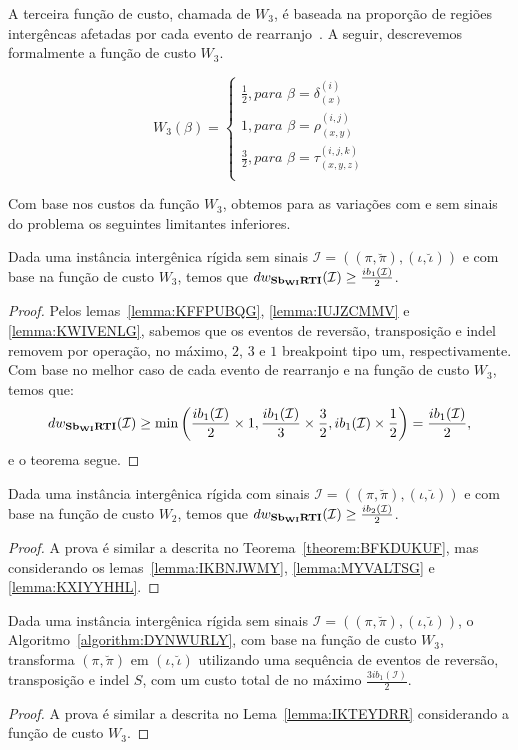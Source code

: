 A terceira função de custo, chamada de $W_3$, é baseada na proporção de regiões intergêncas afetadas por cada evento de rearranjo~\cite{2018-alexandrino-etal}. A seguir, descrevemos formalmente a função de custo $W_3$.

$$
  W_3(\beta) = \begin{cases}
      \frac{1}{2}, \textit{para } \beta = \delta_{(x)}^{(i)} \\
      1, \textit{para } \beta = \rho_{(x,y)}^{(i,j)} \\
      \frac{3}{2}, \textit{para } \beta = \tau_{(x,y,z)}^{(i,j,k)} \\
  \end{cases}
$$

Com base nos custos da função $W_3$, obtemos para as variações com e sem sinais do problema \SbWIRTI{} os seguintes limitantes inferiores.

\begin{theorem}\label{theorem:BFKDUKUF}
Dada uma instância intergênica rígida sem sinais $\mathcal{I}=((\pi,\breve\pi),(\iota,\breve\iota))$ e com base na função de custo $W_3$, temos que $dw_{\textbf{Sb\textsubscript{WI}RTI}}(\mathcal{I}) \ge \frac{ib_1(\mathcal{I})}{2}$.
\begin{proof}
Pelos lemas~\ref{lemma:KFFPUBQG}, \ref{lemma:IUJZCMMV} e \ref{lemma:KWIVENLG}, sabemos que os eventos de reversão, transposição e indel removem por operação, no máximo, $2$, $3$ e $1$ breakpoint tipo um, respectivamente. Com base no melhor caso de cada evento de rearranjo e na função de custo $W_3$, temos que:
$$dw_{\textbf{Sb\textsubscript{WI}RTI}}(\mathcal{I}) \ge \min\left(\frac{ib_1(\mathcal{I})}{2} \times 1,\frac{ib_1(\mathcal{I})}{3} \times \frac{3}{2}, ib_1(\mathcal{I}) \times \frac{1}{2}\right) = \frac{ib_1(\mathcal{I})}{2},$$ e o teorema segue.
\end{proof}
\end{theorem}

\begin{theorem}\label{theorem:ACJPZCWD}
Dada uma instância intergênica rígida com sinais $\mathcal{I}=((\pi,\breve\pi),(\iota,\breve\iota))$ e com base na função de custo $W_2$, temos que $dw_{\textbf{Sb\textsubscript{WI}RTI}}(\mathcal{I}) \ge \frac{ib_2(\mathcal{I})}{2}$.
\begin{proof}
A prova é similar a descrita no Teorema~\ref{theorem:BFKDUKUF}, mas considerando os lemas~\ref{lemma:IKBNJWMY}, \ref{lemma:MYVALTSG} e \ref{lemma:KXIYYHHL}.
\end{proof}
\end{theorem}

\begin{lemma}\label{lemma:FESYSSFB}
Dada uma instância intergênica rígida sem sinais $\mathcal{I}=((\pi,\breve\pi),(\iota,\breve\iota))$, o Algoritmo~\ref{algorithm:DYNWURLY}, com base na função de custo $W_3$, transforma $(\pi,\breve\pi)$ em $(\iota,\breve\iota)$ utilizando uma sequência de eventos de reversão, transposição e indel $S$, com um custo total de no máximo $\frac{3ib_1(\mathcal{I})}{2}$.
\end{lemma}
\begin{proof}
  A prova é similar a descrita no Lema~\ref{lemma:IKTEYDRR} considerando a função de custo $W_3$.
\end{proof}

